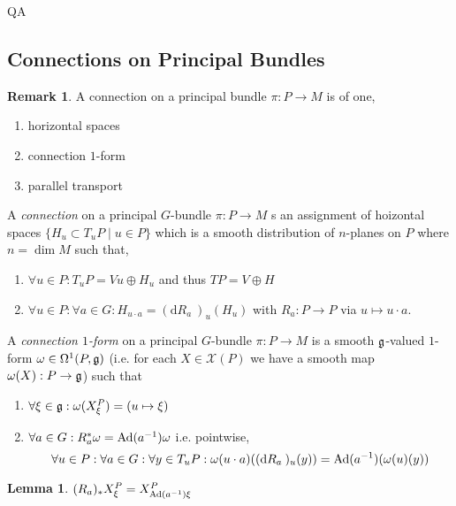 QA	 \documentclass[12pt]{extarticle}
\renewcommand{\d}[1]{ \mathrm{d}#1 \:}
\theoremstyle{definition}
\newtheorem{lemma}[theorem]{Lemma}
\newtheorem{remark}{Remark}
\newenvironment{definition}[1][Definition:]{\begin{trivlist}
\item[\hskip \labelsep {\bfseries #1}]}{\end{trivlist}}
\begin{document}
\subsection{Connections on Principal Bundles}

\begin{remark}
A connection on a principal bundle $\pi : P \to M$ is of one,
\begin{enumerate}
\item horizontal spaces

\item connection $1$-form

\item parallel transport
\end{enumerate}
\end{remark}


\begin{definition}
A \textit{connection} on a principal $G$-bundle $\pi : P \to M$ s an assignment of hoizontal spaces $\{ H_u \subset T_u P \mid u \in P \}$ which is a smooth distribution of $n$-planes on $P$ where $n = \dim{M}$ such that,
\begin{enumerate}
\item $\forall u \in P : T_u P = Vu \oplus H_u$ and thus $TP = V \oplus H$
\item $\forall u \in P : \forall a \in G : H_{u \cdot a} = (\d{R_a})_u (H_u)$ with $R_a : P \to P$ via $u \mapsto u \cdot a$. 
\end{enumerate}
\end{definition}

\begin{definition}
A \textit{connection $1$-form} on a principal $G$-bundle $\pi : P \to M$ is a smooth $\mathfrak{g}$-valued $1$-form $\omega \in \Omega^1(P, \mathfrak{g})$ (i.e. for each $X \in \mathscr{X}(P)$ we have a smooth map $\omega(X) : P \to \mathfrak{g}$) such that
\begin{enumerate}
\item $\forall \xi \in \mathfrak{g} : \omega(X^P_\xi) = (u \mapsto \xi)$
\item $\forall a \in G : R_a^* \omega = \mathrm{Ad}(a^{-1}) \omega$ i.e. pointwise, 
\[ \forall u \in P : \forall a \in G : \forall y \in T_u P : \omega(u \cdot a)((\d{R_a})_u(y)) = \Ad(a^{-1})(\omega(u)(y)) \]
\end{enumerate}
\end{definition}

\begin{lemma}
$(R_a)_* X^P_\xi = X^P_{\mathrm{Ad}(a^{-1}) \xi}$ 
\end{lemma}
\end{document}
